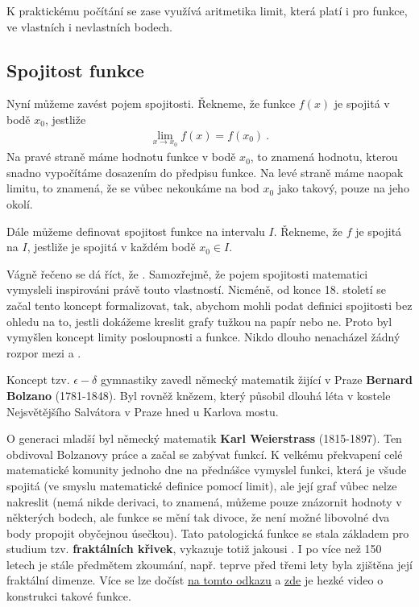 K praktickému počítání se zase využívá aritmetika limit, která platí i pro funkce, ve vlastních i nevlastních bodech.

\subsection*{Spojitost funkce}

Nyní můžeme zavést pojem spojitosti. Řekneme, že funkce $f(x)$ je spojitá v bodě $x_0$, jestliže \begin{align}
    \lim_{x \rightarrow x_0} f(x) = f(x_0) \:.
\end{align}
Na pravé straně máme hodnotu funkce v bodě $x_0$, to znamená hodnotu, kterou snadno vypočítáme dosazením do předpisu funkce. Na levé straně máme naopak limitu, to znamená, že se vůbec nekoukáme na bod $x_0$ jako takový, pouze na jeho okolí.

Dále můžeme definovat spojitost funkce na intervalu $I$. Řekneme, že $f$ je spojitá na $I$, jestliže je spojitá v každém bodě $x_0 \in I$.


\begin{remark}
    Vágně řečeno se dá říct, že . 
    Samozřejmě, že pojem spojitosti matematici vymysleli inspirováni právě touto vlastností. Nicméně, od konce 18. století se začal tento koncept formalizovat, tak, abychom mohli podat definici spojitosti bez ohledu na to, jestli dokážeme kreslit grafy tužkou na papír nebo ne. Proto byl vymyšlen koncept limity posloupnosti a funkce. Nikdo dlouho nenacházel žádný rozpor mezi  a .

    Koncept tzv. $\epsilon-\delta$ gymnastiky zavedl německý matematik žijící v Praze \textbf{Bernard Bolzano} (1781-1848). Byl rovněž knězem, který působil dlouhá léta v kostele Nejsvětějšího Salvátora v Praze hned u Karlova mostu.

    O generaci mladší byl německý matematik \textbf{Karl Weierstrass} (1815-1897). Ten obdivoval Bolzanovy práce a začal se zabývat  funkcí. K velkému překvapení celé matematické komunity jednoho dne na přednášce vymyslel funkci, která je všude spojitá (ve smyslu matematické definice pomocí limit), ale její graf vůbec nelze nakreslit (nemá nikde derivaci, to znamená, můžeme pouze znázornit hodnoty v některých bodech, ale funkce se mění tak divoce, že není možné libovolné dva body propojit obyčejnou úsečkou). Tato patologická funkce se stala základem pro studium tzv. \textbf{fraktálních křivek}, vykazuje totiž jakousi . I po více než 150 letech je stále předmětem zkoumání, např. teprve před třemi lety byla zjištěna její fraktální dimenze. Více se lze dočíst \href{https://en.wikipedia.org/wiki/Weierstrass_function}{na tomto odkazu} a \href{https://www.youtube.com/watch?v=jz1fugkBGNA}{zde} je hezké video o konstrukci takové funkce.
\end{remark}

